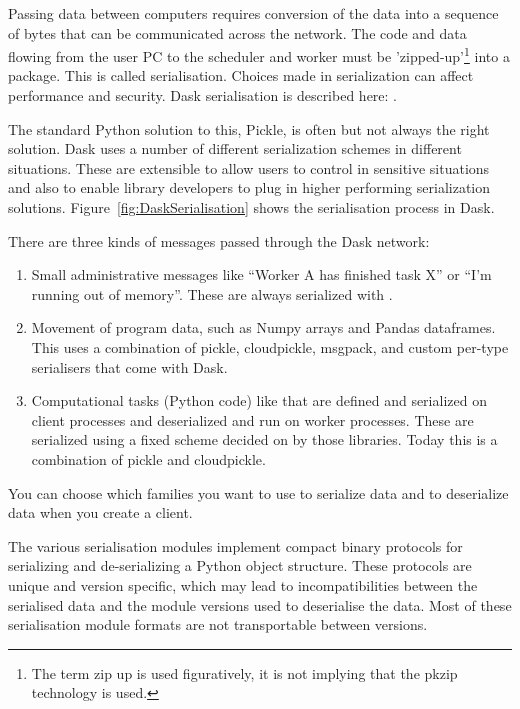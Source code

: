 Passing data between computers requires conversion of the data into a sequence of bytes that can be communicated across the network. The code and data flowing from the user PC to the scheduler and worker must be 'zipped-up'\footnote{The term zip up is used figuratively, it is not implying that the pkzip technology is used.} into a package. This is called serialisation.
Choices made in serialization can affect performance and security.
Dask serialisation is described here: 
.

The standard Python solution to this, Pickle, is often but not always the right solution. Dask uses a number of different serialization schemes in different situations. These are extensible to allow users to control in sensitive situations and also to enable library developers to plug in higher performing serialization solutions. Figure~\ref{fig:DaskSerialisation} shows the serialisation process in Dask.


There are three kinds of messages passed through the Dask network:

\begin{enumerate}
    \item Small administrative messages like ``Worker A has finished task X'' or ``I'm running out of memory''. These are always serialized with .
    \item  Movement of program data, such as Numpy arrays and Pandas dataframes. This uses a combination of pickle, cloudpickle, msgpack, and custom per-type serialisers that come with Dask.
    \item Computational tasks (Python code) like  that are defined and serialized on client processes and deserialized and run on worker processes. These are serialized using a fixed scheme decided on by those libraries. Today this is a combination of pickle and cloudpickle.

\end{enumerate}
You can choose which families you want to use to serialize data and to deserialize data when you create a client.

The various serialisation modules implement compact binary protocols for serializing and de-serializing a Python object structure. These protocols are unique and version specific, which may lead to incompatibilities between the serialised data and the module versions used to deserialise the data. Most of these serialisation module formats are not transportable between versions.

